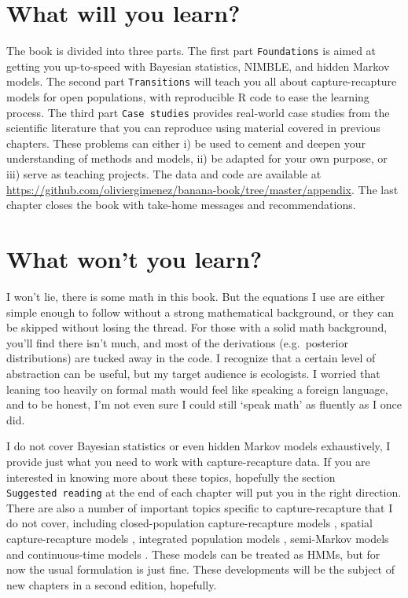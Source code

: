 \documentclass[
  12pt,
]{krantz}
\begin{document}
\section*{What will you learn?}\label{what-will-you-learn}


The book is divided into three parts. The first part \texttt{Foundations} is aimed at getting you up-to-speed with Bayesian statistics, NIMBLE, and hidden Markov models. The second part \texttt{Transitions} will teach you all about capture-recapture models for open populations, with reproducible R code to ease the learning process. The third part \texttt{Case\ studies} provides real-world case studies from the scientific literature that you can reproduce using material covered in previous chapters. These problems can either i) be used to cement and deepen your understanding of methods and models, ii) be adapted for your own purpose, or iii) serve as teaching projects. The data and code are available at \url{https://github.com/oliviergimenez/banana-book/tree/master/appendix}. The last chapter closes the book with take-home messages and recommendations.

\section*{What won't you learn?}\label{what-wont-you-learn}


I won't lie, there is some math in this book. But the equations I use are either simple enough to follow without a strong mathematical background, or they can be skipped without losing the thread. For those with a solid math background, you'll find there isn't much, and most of the derivations (e.g.~posterior distributions) are tucked away in the code. I recognize that a certain level of abstraction can be useful, but my target audience is ecologists. I worried that leaning too heavily on formal math would feel like speaking a foreign language, and to be honest, I'm not even sure I could still `speak math' as fluently as I once did.

I do not cover Bayesian statistics or even hidden Markov models exhaustively, I provide just what you need to work with capture-recapture data. If you are interested in knowing more about these topics, hopefully the section \texttt{Suggested\ reading} at the end of each chapter will put you in the right direction. There are also a number of important topics specific to capture-recapture that I do not cover, including closed-population capture-recapture models \citep{WilliamsEtAl2002}, spatial capture-recapture models \citep{RoyleEtAl2013book}, integrated population models \citep{BesbeasMorgan2019}, semi-Markov models \citep[e.g.][]{choquet_semi-markov_2011} and continuous-time models \citep{rushing2023continuouscr}. These models can be treated as HMMs, but for now the usual formulation is just fine. These developments will be the subject of new chapters in a second edition, hopefully.
\end{document}
